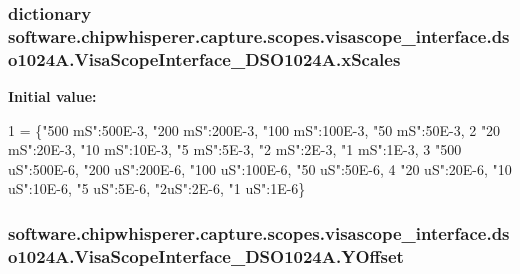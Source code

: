 \subsubsection[{x\+Scales}]{\setlength{\rightskip}{0pt plus 5cm}dictionary software.\+chipwhisperer.\+capture.\+scopes.\+visascope\+\_\+interface.\+dso1024\+A.\+Visa\+Scope\+Interface\+\_\+\+D\+S\+O1024\+A.\+x\+Scales\hspace{0.3cm}{\ttfamily [static]}}\label{classsoftware_1_1chipwhisperer_1_1capture_1_1scopes_1_1visascope__interface_1_1dso1024A_1_1VisaScopeInterface__DSO1024A_a46f83ab9ebef915acf5dac907925e59b}
{\bfseries Initial value\+:}
\begin{DoxyCode}
1 = \{\textcolor{stringliteral}{"500 mS"}:500E-3, \textcolor{stringliteral}{"200 mS"}:200E-3, \textcolor{stringliteral}{"100 mS"}:100E-3, \textcolor{stringliteral}{"50 mS"}:50E-3,
2                \textcolor{stringliteral}{"20 mS"}:20E-3, \textcolor{stringliteral}{"10 mS"}:10E-3, \textcolor{stringliteral}{"5 mS"}:5E-3, \textcolor{stringliteral}{"2 mS"}:2E-3, \textcolor{stringliteral}{"1 mS"}:1E-3,
3                \textcolor{stringliteral}{"500 uS"}:500E-6, \textcolor{stringliteral}{"200 uS"}:200E-6, \textcolor{stringliteral}{"100 uS"}:100E-6, \textcolor{stringliteral}{"50 uS"}:50E-6,
4                \textcolor{stringliteral}{"20 uS"}:20E-6, \textcolor{stringliteral}{"10 uS"}:10E-6, \textcolor{stringliteral}{"5 uS"}:5E-6, \textcolor{stringliteral}{"2uS"}:2E-6, \textcolor{stringliteral}{"1 uS"}:1E-6\}
\end{DoxyCode}
\hypertarget{classsoftware_1_1chipwhisperer_1_1capture_1_1scopes_1_1visascope__interface_1_1dso1024A_1_1VisaScopeInterface__DSO1024A_af504e998f28897b41c441e8ce23d67f6}{}
\subsubsection[{Y\+Offset}]{\setlength{\rightskip}{0pt plus 5cm}software.\+chipwhisperer.\+capture.\+scopes.\+visascope\+\_\+interface.\+dso1024\+A.\+Visa\+Scope\+Interface\+\_\+\+D\+S\+O1024\+A.\+Y\+Offset}\label{classsoftware_1_1chipwhisperer_1_1capture_1_1scopes_1_1visascope__interface_1_1dso1024A_1_1VisaScopeInterface__DSO1024A_af504e998f28897b41c441e8ce23d67f6}


